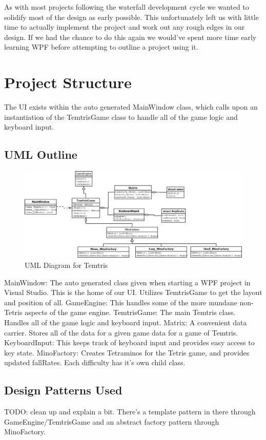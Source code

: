 \documentclass[10pt,conference,onecolumn,compsoc]{IEEEtran}
\begin{document}
As with most projects following the waterfall development cycle we wanted to solidify most of the design as early possible. This unfortunately left us with little time to actually implement the project and work out any rough edges in our design. If we had the chance to do this again we would've spent more time early learning WPF before attempting to outline a project using it. 

\section{Project Structure}

The UI exists within the auto generated MainWindow class, which calls upon an instantiation of the TemtrisGame class to handle all of the game logic and keyboard input.

\subsection{UML Outline}

\begin{figure}[h!]
\includegraphics[scale=0.35]{TemtrisUML.png}
\caption{UML Diagram for Temtris}
\end{figure}

MainWindow: The auto generated class given when starting a WPF project in Visual Studio. This is the home of our UI. Utilizes TemtrisGame to get the layout and position of all.
GameEngine: This handles some of the more mundane non-Tetris aspects of the game engine.
TemtrisGame: The main Temtris class. Handles all of the game logic and keyboard input.
Matrix: A convenient data carrier. Stores all of the data for a given game data for a game of Temtris.
KeyboardInput: This keeps track of keyboard input and provides easy access to key state.
MinoFactory: Creates Tetraminos for the Tetris game, and provides updated fallRates. Each difficulty has it's own child class.


\subsection{Design Patterns Used}
TODO: clean up and explain a bit.
There's a template pattern in there through GameEngine/TemtrisGame and an abstract factory pattern through MinoFactory.
\end{document}
